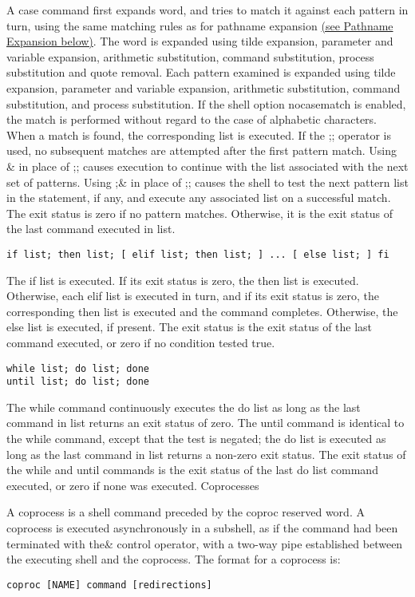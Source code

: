 \documentclass[11pt]{article}
\begin{document}
A case command first expands word, and tries to match it against each pattern in turn, using the same matching rules as for pathname expansion \hyperref[sec:pathnameexpansion]{(see Pathname Expansion below)}. The word is expanded using tilde expansion, parameter and variable expansion, arithmetic substitution, command substitution, process substitution and quote removal. Each pattern examined is expanded using tilde expansion, parameter and variable expansion, arithmetic substitution, command substitution, and process substitution. If the shell option nocasematch is enabled, the match is performed without regard to the case of alphabetic characters. When a match is found, the corresponding list is executed. If the ;; operator is used, no subsequent matches are attempted after the first pattern match. Using \& in place of ;; causes execution to continue with the list associated with the next set of patterns. Using ;\& in place of ;; causes the shell to test the next pattern list in the statement, if any, and execute any associated list on a successful match. The exit status is zero if no pattern matches. Otherwise, it is the exit status of the last command executed in list.
\begin{lstlisting}
if list; then list; [ elif list; then list; ] ... [ else list; ] fi
\end{lstlisting}\label{lst:if}

The if list is executed. If its exit status is zero, the then list is executed. Otherwise, each elif list is executed in turn, and if its exit status is zero, the corresponding then list is executed and the command completes. Otherwise, the else list is executed, if present. The exit status is the exit status of the last command executed, or zero if no condition tested true.
\begin{lstlisting}
while list; do list; done
until list; do list; done
\end{lstlisting}
The while command continuously executes the do list as long as the last command in list returns an exit status of zero. The until command is identical to the while command, except that the test is negated; the do list is executed as long as the last command in list returns a non-zero exit status. The exit status of the while and until commands is the exit status of the last do list command executed, or zero if none was executed.
Coprocesses

A coprocess is a shell command preceded by the coproc reserved word. A coprocess is executed asynchronously in a subshell, as if the command had been terminated with the\& control operator, with a two-way pipe established between the executing shell and the coprocess.
The format for a coprocess is:
\begin{lstlisting}
coproc [NAME] command [redirections]
\end{lstlisting}
\end{document}
